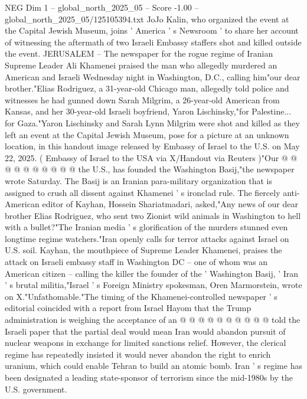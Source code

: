 \begin{textsample}{NEG Dim 1 – global\_north\_2025\_05 – Score -1.00 – global\_north\_2025\_05/125105394.txt}  \label{ex:f1_neg_230}
JoJo Kalin, who organized the event at the Capital Jewish Museum, joins ' America ' s Newsroom ' to share her account of witnessing the aftermath of two Israeli Embassy staffers shot and killed outside the event.
JERUSALEM -- The newspaper for the rogue regime of Iranian Supreme Leader Ali Khamenei praised the man who allegedly murdered an American and Israeli Wednesday night in Washington, D.C., calling him"our dear brother."Elias Rodriguez, a 31-year-old Chicago man, allegedly told police and witnesses he had gunned down Sarah Milgrim, a 26-year-old American from Kansas, and her 30-year-old Israeli boyfriend, Yaron Lischinsky,"for Palestine... for Gaza."Yaron Lischinsky and Sarah Lynn Milgrim were shot and killed as they left an event at the Capital Jewish Museum, pose for a picture at an unknown location, in this handout image released by Embassy of Israel to the U.S. on May 22, 2025. ( Embassy of Israel to the USA via X/Handout via Reuters )"Our @ @ @ @ @ @ @ @ @ @ the U.S., has founded the Washington Basij,"the newspaper wrote Saturday.
The Basij is an Iranian para-military organization that is assigned to crush all dissent against Khamenei ' s ironclad rule.
The fiercely anti-American editor of Kayhan, Hossein Shariatmadari, asked,"Any news of our dear brother Elias Rodriguez, who sent two Zionist wild animals in Washington to hell with a bullet?"The Iranian media ' s glorification of the murders stunned even longtime regime watchers."Iran openly calls for terror attacks against Israel on U.S. soil.
Kayhan, the mouthpiece of Supreme Leader Khamenei, praises the attack on Israeli embassy staff in Washington DC -- one of whom was an American citizen -- calling the killer the founder of the ' Washington Basij, ' Iran ' s brutal militia,"Israel ' s Foreign Ministry spokesman, Oren Marmorstein, wrote on X."Unfathomable."The timing of the Khamenei-controlled newspaper ' s editorial coincided with a report from Israel Hayom that the Trump administration is weighing the acceptance of an @ @ @ @ @ @ @ @ @ @ told the Israeli paper that the partial deal would mean Iran would abandon pursuit of nuclear weapons in exchange for limited sanctions relief.
However, the clerical regime has repeatedly insisted it would never abandon the right to enrich uranium, which could enable Tehran to build an atomic bomb.
Iran ' s regime has been designated a leading state-sponsor of terrorism since the mid-1980s by the U.S. government.

\end{textsample}
